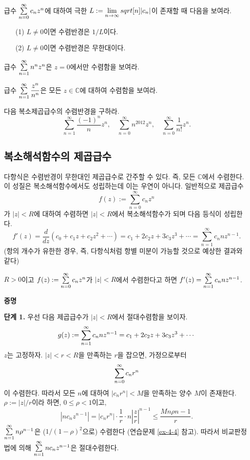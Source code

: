 \begin{salt_exercise}\label{ex-4-6}
급수 $\sum\limits_{n=0}^\infty c_nz^n$에 대하여
극한 $L:=\lim\limits_{n\to\infty} sqrt[n]{|c_n|}$이 존재할 때
다음을 보여라.
\begin{itemize}
\item[(1)] $L\ne 0$이면 수렴반경은 $1/L$이다.
\item[(2)] $L\ne0$이면 수렴반경은 무한대이다.
\end{itemize}
\end{salt_exercise}

\begin{salt_exercise}\label{ex-4-7}
급수 $\sum\limits_{n=1}^\infty n^nz^n$은
$z=0$에서만 수렴함을 보여라.
\end{salt_exercise}

\begin{salt_exercise}\label{ex-4-8}
급수 $\sum\limits_{n=1}^\infty \displaystyle\frac{z^n}{n^n}$은
모든 $z\in\mathbb C$에 대하여 수렴함을 보여라.
\end{salt_exercise}

\begin{salt_exercise}\label{ex-4-9}
다음 복소제곱급수의 수렴반경을 구하라.
\[
\sum_{n=1}^\infty \dfrac{(-1)^n}{n}z^n,\quad
\sum_{n=0}^\infty n^{2012}z^n, \quad
\sum_{n=0}^\infty \dfrac1{n!}z^n.
\]
\end{salt_exercise}

\subsection{복소해석함수의 제곱급수}

다항식은 수렴반경이 무한대인 제곱급수로 간주할 수 있다.
즉, 모든 $\mathbb C$에서 수렴한다.
이 성질은 복소해석함수에서도 성립하는데
이는 우연이 아니다.
일반적으로 제곱급수 
\[
f(z):= \sum_{n=0}^\infty c_nz^n
\]
가 $|z|<R$에 대하여 수렴하면
$|z|<R$에서 복소해석함수가 되며 
다음 등식이 성립한다.
\[
f'(z) = \dfrac d{dz} (c_0+ c_1z + c_2z^2 + \cdots)
= c_1 + 2c_2z + 3c_3z^3 + \cdots 
= \sum_{n=1}^\infty c_n n z^{n-1}.
\]
(항의 개수가 유한한 경우, 즉, 다항식처럼 
항별 미분이 가능할 것으로 예상한 결과와 같다)

\begin{salt_theorem}\label{thm-4-3}
$R>0$이고 $f(z):= \sum\limits_{n=0}^\infty c_nz^n$가
$|z|<R$에서 수렴한다고 하면
$f'(z) = \sum\limits_{n=1}^\infty c_n n z^{n-1}$.
\end{salt_theorem}

{\bf 증명}

{\bf 단계 1.}
우선 다음 제곱급수가 $|z|<R$에서 절대수렴함을 보이자.
\[
g(z):= \sum\limits_{n=1}^\infty c_n n z^{n-1}
=  c_1 + 2c_2z + 3c_3z^3 + \cdots
\]
$z$는 고정하자.
$|z|<r<R$을 만족하는 $r$을 잡으면, 가정으로부터
\[
\sum\limits_{n=0}^\infty c_nr^n
\]
이 수렴한다. 따라서 모든 $n$에 대하여
$|c_nr^n|<M$을 만족하는 양수 $M$이 존재한다.
$\rho:=|z|/r$이라 하면, $0\le \rho <1$이고,
\[
|nc_nz^{n-1}| = |c_nr^n| \cdot 
\dfrac1r \cdot n \left| \dfrac zr\right|^{n-1}
\le \dfrac{Mn\rho{n-1}}r.
\]
$\sum\limits_{n=1}^\infty n\rho^{n-1}$은 
($1/(1-\rho)^2$으로) 수렴한다 (연습문제 \ref{ex-4-4} 참고).
따라서 비교판정법에 의해
$\sum\limits_{n=1}^\infty nc_nz^{n-1}$은 절대수렴한다.

